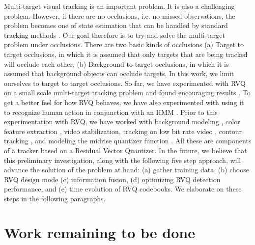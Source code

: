 \documentclass[12pt,letterpaper,doublespaced,ETD,proposal]{gt-ece-thesis}
\begin{document}
\begin{Body}
Multi-target visual tracking is an important problem.  It is also a challenging problem.  However, if there are no occlusions, i.e. no missed observations, the problem becomes one of state estimation that can be handled by standard tracking methods \cite{1972_CNF_PDAF_BarShalom,1975_JNL_PDAF_BarShalom,1978_JNL_SURVEYmtt_Barshalom,1983_JNL_JPDAF_Fortmann,2009_JNL_PDAF_Barshalom, 1997_CNF_UKF_Julier, 1998_JNL_Condensation_IsardBlake}.  Our goal therefore is to try and solve the multi-target problem under occlusions.  There are two basic kinds of occlusions (a) Target to target occlusions, in which it is assumed that only targets that are being tracked will occlude each other, (b) Background to target occlusions, in which it is assumed that background objects can occlude targets.  In this work, we limit ourselves to target to target occlusions.  So far, we have experimented with RVQ on a small scale multi-target tracking problem and found encouraging results \cite{2010_CNF_TrkRVQ_Aslam}.  To get a better feel for how RVQ behaves, we have also experimented with using it to recognize human action in conjunction with an HMM \cite{2010_CNF_TrkRVQ_Aslam}.  Prior to this experimentation with RVQ, we have worked with background modeling \cite{2008_TECH_MGDSP_Aslam}, color feature extraction \cite{2008_TECH_3DvideoColorEnhancement_Aslam}, video stabilization, tracking on low bit rate video \cite{2009_CNF_CVcompMS1_Aslam,2009_CNF_Compensation_Aslam}, contour tracking \cite{2010_CNF_VehicleContour_Aslam}, and modeling the midrise quantizer function \cite{2010_CNF_Quant_Aslam}.  All these are components of a tracker based on a Residual Vector Quantizer.  In the future, we believe that this preliminary investigation, along with the following five step approach, will advance the solution of the problem at hand: (a) gather training data, (b) choose RVQ design mode (c) information fusion, (d) optimizing RVQ detection performance, and (e) time evolution of RVQ codebooks.  We elaborate on these steps in the following paragraphs.


\newpage
\section{Work remaining to be done}
\label{remains}


\end{Body}
\end{document}

